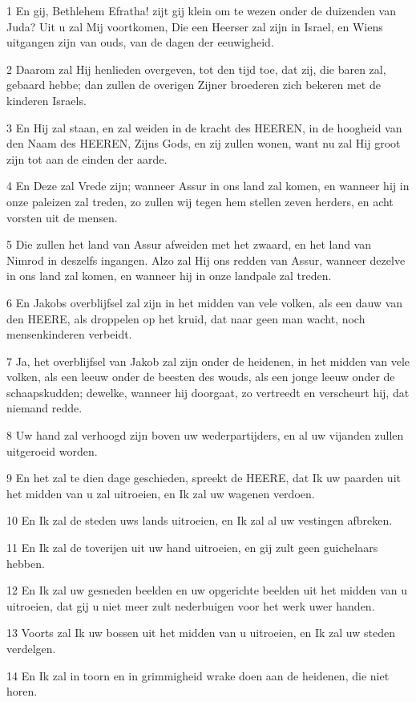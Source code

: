 \par 1 En gij, Bethlehem Efratha! zijt gij klein om te wezen onder de duizenden van Juda? Uit u zal Mij voortkomen, Die een Heerser zal zijn in Israel, en Wiens uitgangen zijn van ouds, van de dagen der eeuwigheid.
\par 2 Daarom zal Hij henlieden overgeven, tot den tijd toe, dat zij, die baren zal, gebaard hebbe; dan zullen de overigen Zijner broederen zich bekeren met de kinderen Israels.
\par 3 En Hij zal staan, en zal weiden in de kracht des HEEREN, in de hoogheid van den Naam des HEEREN, Zijns Gods, en zij zullen wonen, want nu zal Hij groot zijn tot aan de einden der aarde.
\par 4 En Deze zal Vrede zijn; wanneer Assur in ons land zal komen, en wanneer hij in onze paleizen zal treden, zo zullen wij tegen hem stellen zeven herders, en acht vorsten uit de mensen.
\par 5 Die zullen het land van Assur afweiden met het zwaard, en het land van Nimrod in deszelfs ingangen. Alzo zal Hij ons redden van Assur, wanneer dezelve in ons land zal komen, en wanneer hij in onze landpale zal treden.
\par 6 En Jakobs overblijfsel zal zijn in het midden van vele volken, als een dauw van den HEERE, als droppelen op het kruid, dat naar geen man wacht, noch mensenkinderen verbeidt.
\par 7 Ja, het overblijfsel van Jakob zal zijn onder de heidenen, in het midden van vele volken, als een leeuw onder de beesten des wouds, als een jonge leeuw onder de schaapskudden; dewelke, wanneer hij doorgaat, zo vertreedt en verscheurt hij, dat niemand redde.
\par 8 Uw hand zal verhoogd zijn boven uw wederpartijders, en al uw vijanden zullen uitgeroeid worden.
\par 9 En het zal te dien dage geschieden, spreekt de HEERE, dat Ik uw paarden uit het midden van u zal uitroeien, en Ik zal uw wagenen verdoen.
\par 10 En Ik zal de steden uws lands uitroeien, en Ik zal al uw vestingen afbreken.
\par 11 En Ik zal de toverijen uit uw hand uitroeien, en gij zult geen guichelaars hebben.
\par 12 En Ik zal uw gesneden beelden en uw opgerichte beelden uit het midden van u uitroeien, dat gij u niet meer zult nederbuigen voor het werk uwer handen.
\par 13 Voorts zal Ik uw bossen uit het midden van u uitroeien, en Ik zal uw steden verdelgen.
\par 14 En Ik zal in toorn en in grimmigheid wrake doen aan de heidenen, die niet horen.

